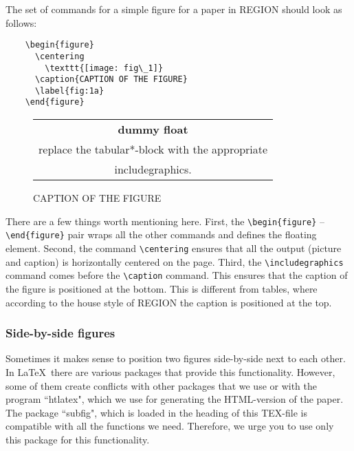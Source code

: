 \documentclass[a4paper,twoside]{article}
\begin{document}
The set of commands for a simple figure for a paper in REGION should look as follows:

\begin{verbatim}
    \begin{figure}
      \centering
        \texttt{[image: fig\_1]}
      \caption{CAPTION OF THE FIGURE}
      \label{fig:1a}
    \end{figure}
\end{verbatim}

\begin{figure}
\centering
\begin{tabular*}{0.5\textwidth}{|c|}
{\bf dummy float} \\
replace the tabular*-block with the appropriate \\
includegraphics.
\end{tabular*}
\caption{CAPTION OF THE FIGURE}
\label{fig:1}
\end{figure}

\noindent There are a few things worth mentioning here. First, the \verb|\begin{figure}| -- \verb|\end{figure}| pair wraps all the other commands and defines the floating element. Second, the command \verb|\centering| ensures that all the output (picture and caption) is horizontally centered on the page. Third, the \verb|\includegraphics| command comes before the \verb|\caption| command. This ensures that the caption of the figure is positioned at the bottom. This is different from tables, where according to the house style of REGION the caption is positioned at the top.


\subsubsection{Side-by-side figures}
\label{sec:4.1.2}

Sometimes it makes sense to position two figures side-by-side next to each other. In \LaTeX\ there are various packages that provide this functionality. However, some of them create conflicts with other packages that we use or with the program ``htlatex", which we use for generating the HTML-version of the paper. The package ``subfig", which is loaded in the heading of this TEX-file is compatible with all the functions we need. Therefore, we urge you to use only this package for this functionality. 
\end{document}
